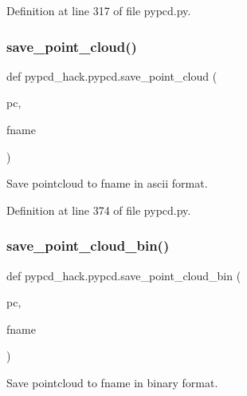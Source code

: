 Definition at line 317 of file pypcd.\+py.

\mbox{\label{namespacepypcd__hack_1_1pypcd_a8535ec59422d4edc82f22f6ce269b22b}} 
\subsubsection{\texorpdfstring{save\+\_\+point\+\_\+cloud()}{save\_point\_cloud()}}
{\footnotesize\ttfamily def pypcd\+\_\+hack.\+pypcd.\+save\+\_\+point\+\_\+cloud (\begin{DoxyParamCaption}\item[{}]{pc,  }\item[{}]{fname }\end{DoxyParamCaption})}

\begin{DoxyVerb}Save pointcloud to fname in ascii format.
\end{DoxyVerb}
 

Definition at line 374 of file pypcd.\+py.

\mbox{\label{namespacepypcd__hack_1_1pypcd_a8d901a6917508e63e158fbae069d1628}} 
\subsubsection{\texorpdfstring{save\+\_\+point\+\_\+cloud\+\_\+bin()}{save\_point\_cloud\_bin()}}
{\footnotesize\ttfamily def pypcd\+\_\+hack.\+pypcd.\+save\+\_\+point\+\_\+cloud\+\_\+bin (\begin{DoxyParamCaption}\item[{}]{pc,  }\item[{}]{fname }\end{DoxyParamCaption})}

\begin{DoxyVerb}Save pointcloud to fname in binary format.
\end{DoxyVerb}
 

